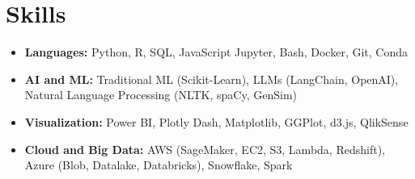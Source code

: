 \documentclass[letterpaper,11pt]{article}
\begin{document}
\section{\Large{Skills}}
\vspace{3pt}
\begin{itemize}[leftmargin=0.00in, label={}, itemsep=0pt, parsep=0pt]
    \item{
        \small{\textbf{Languages:}}
        \small{Python, R, SQL, JavaScript} 
        \hspace{0.7cm}
        {\fontsize{10.2pt}{13pt}\selectfont{Tools:}}
        \small{Jupyter, Bash, Docker, Git, Conda}
        }




    \item{
        \small{\textbf{AI and ML:}}
        \small{Traditional ML (Scikit-Learn), LLMs (LangChain, OpenAI), Natural Language Processing (NLTK, spaCy, GenSim) }
        }

    \item{
        \small{\textbf{Visualization:}}
        \small{Power BI, Plotly Dash, Matplotlib, GGPlot, d3.js, QlikSense}
        }
        
    \item{
        \small{\textbf{Cloud and Big Data:}}
        \small{AWS (SageMaker, EC2, S3, Lambda, Redshift), Azure (Blob, Datalake, Databricks), Snowflake, Spark}
        }

    
\end{itemize}

\vspace{-16pt}
\end{document}
